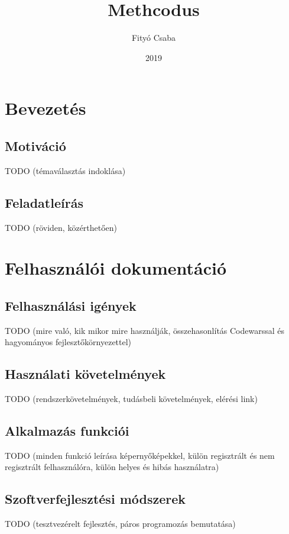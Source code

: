 \documentclass{elteikthesis}
\title{Methcodus}
\date{2019}
\author{Fityó Csaba}
\affiliation{mesteroktató}
\begin{document}

	\maketitle

	\tableofcontents

	\chapter{Bevezetés}

		\section{Motiváció}
		TODO (témaválasztás indoklása)

		\section{Feladatleírás}
		TODO (röviden, közérthetően)

	\chapter{Felhasználói dokumentáció}

		\section{Felhasználási igények}
		TODO (mire való, kik mikor mire használják, összehasonlítás Codewarssal és hagyományos fejlesztőkörnyezettel)
		
		\section{Használati követelmények}
		TODO (rendszerkövetelmények, tudásbeli követelmények, elérési link)
		
		\section{Alkalmazás funkciói}
		TODO (minden funkció leírása képernyőképekkel, külön regisztrált és nem regisztrált felhasználóra, külön helyes és hibás használatra)
		
		\section{Szoftverfejlesztési módszerek}
		TODO (tesztvezérelt fejlesztés, páros programozás bemutatása)
\end{document}
